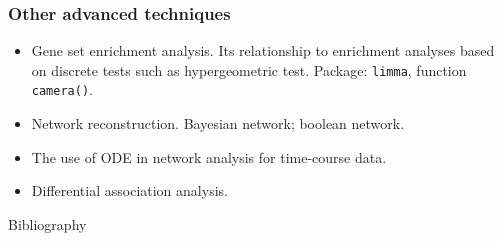 \begin{frame}
  \frametitle{Other advanced techniques}
  \begin{itemize}
  \item Gene set enrichment analysis. Its relationship to enrichment
    analyses based on discrete tests such as hypergeometric
    test. Package: \texttt{limma}, function \texttt{camera()}.
  \item Network reconstruction. Bayesian network; boolean network.
  \item The use of ODE in network analysis for time-course data.
  \item Differential association analysis.
  \end{itemize}
\end{frame}

\begin{frame}[allowframebreaks]{Bibliography}
  
  
\end{frame}



